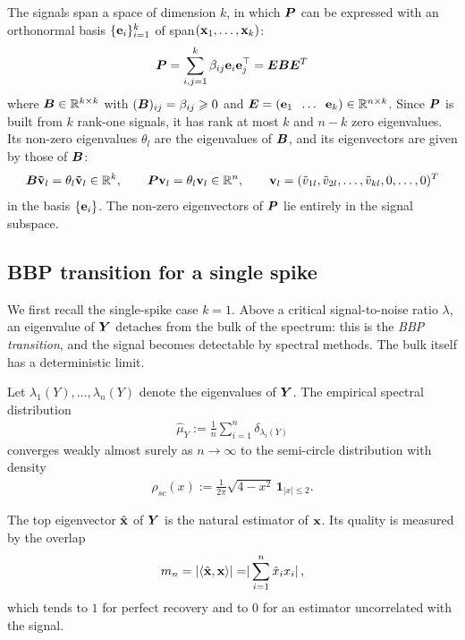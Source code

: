 \noindent
The signals span a space of dimension $k$, in which $\bm{P}$ can be expressed with an orthonormal basis $\{\boldsymbol{\mathbf{e}}_i\}_{i=1}^k$ of span$(\boldsymbol{\mathbf{x}}_1, \dots, \boldsymbol{\mathbf{x}}_k)$:
\begin{equation}
    \bm{P} = \sum_{i,j = 1}^k \beta_{ij} \boldsymbol{\mathbf{e}}_i \boldsymbol{\mathbf{e}}_j^\top = \bm{E} \bm{B} \bm{E}^T
    \label{eq:PinE}
\end{equation}
where $\bm{B} \in {\mathbb R}^{k\times k}$ with $(\bm{B})_{ij} = \beta_{ij} \geqslant 0 $ and $\bm{E} = (\boldsymbol{\mathbf{e}}_1 \;\; \dots \;\; \boldsymbol{\mathbf{e}}_k) \in {\mathbb R}^{n \times k}$. Since $\bm{P}$ is built from $k$ rank-one signals, it has rank at most $k$ and $n-k$ zero eigenvalues. Its non-zero eigenvalues $\theta_l$ are the eigenvalues of $\bm{B}$, and its eigenvectors are given by those of $\bm{B}$:
\[
\bm{B} \boldsymbol{\mathbf{\Tilde{v}}}_l = \theta_l \boldsymbol{\mathbf{\Tilde{v}}}_l \in \mathbb R^k,
\qquad
\bm{P} \boldsymbol{\mathbf{v}}_l = \theta_l \boldsymbol{\mathbf{v}}_l \in \mathbb R^n,
\qquad
\boldsymbol{\mathbf{v}}_l = (\Tilde{v}_{1l},\Tilde{v}_{2l},\ldots,\Tilde{v}_{kl},0,\ldots,0)^T
\]
in the basis $\{\boldsymbol{\mathbf{e}}_i\}$. The non-zero eigenvectors of $\bm{P}$ lie entirely in the signal subspace.

\subsection{BBP transition for a single spike}
We first recall the single-spike case $k=1$. Above a critical signal-to-noise ratio $\lambda$, an eigenvalue of $\bm{Y}$ detaches from the bulk of the spectrum: this is the \emph{BBP transition}, and the signal becomes detectable by spectral methods. The bulk itself has a deterministic limit.

\begin{theo}\label{thm:semi-circle}
Let $\lambda_1(Y),\dots,\lambda_n(Y)$ denote the eigenvalues of $\bm{Y}$. The empirical spectral distribution
\begin{align}
\hat{\mu}_Y := \frac{1}{n}\sum_{i=1}^n \delta_{\lambda_i(Y)}
\end{align}
converges weakly almost surely as $n \to \infty$ to the semi-circle distribution with density
\begin{align}
    \rho_{sc}(x) := \frac{1}{2\pi}\sqrt{4-x^2}\,\mathbf{1}_{|x|\le 2}.
\end{align}
\end{theo}


\noindent
The top eigenvector $\hat{\boldsymbol{\mathbf{x}}}$ of $\bm{Y}$ is the natural estimator of $\boldsymbol{\mathbf{x}}$. Its quality is measured by the overlap
\begin{equation}
    m_n = \lvert \langle \hat{\boldsymbol{\mathbf{x}}} 
     , \boldsymbol{\mathbf{x}}\rangle \rvert = \rvert\sum_{i=1}^n \hat{x}_i x_i \rvert \, ,
    \label{eq:overlap_u}
\end{equation}
which tends to $1$ for perfect recovery and to $0$ for an estimator uncorrelated with the signal.

